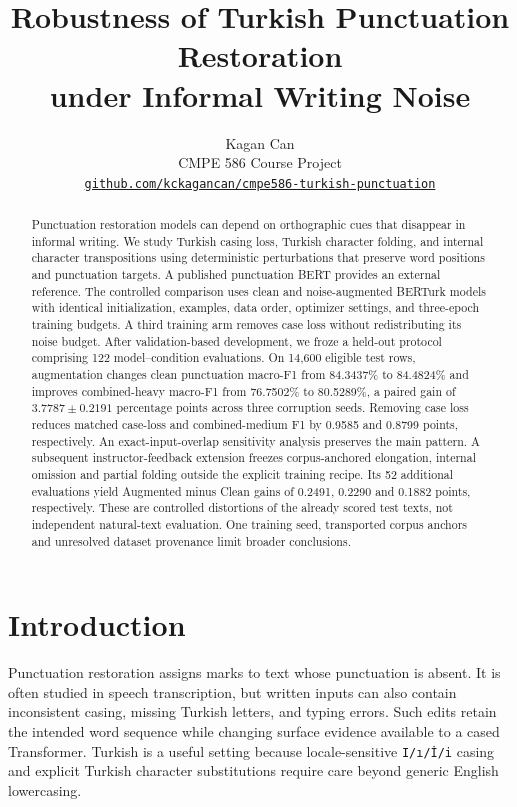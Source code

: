 \documentclass{article}
\title{Robustness of Turkish Punctuation Restoration\\under Informal Writing Noise}
\author{Kagan Can\\CMPE 586 Course Project\\
\href{https://github.com/kckagancan/cmpe586-turkish-punctuation}{\texttt{github.com/kckagancan/cmpe586-turkish-punctuation}}
\ifdefined\CourseSubmission\fi
}
\begin{document}
\maketitle
\begin{abstract}
Punctuation restoration models can depend on orthographic cues that disappear
in informal writing. We study Turkish casing loss, Turkish character folding,
and internal character transpositions using deterministic perturbations that
preserve word positions and punctuation targets. A published punctuation BERT
provides an external reference. The controlled comparison uses clean and
noise-augmented BERTurk models with identical initialization, examples, data
order, optimizer settings, and three-epoch training budgets. A third training
arm removes case loss without redistributing its noise budget. After
validation-based development, we froze a held-out protocol comprising 122
model--condition evaluations. On 14,600 eligible test rows, augmentation changes
clean punctuation macro-F1 from 84.3437\% to 84.4824\% and improves combined-heavy
macro-F1 from 76.7502\% to 80.5289\%, a paired gain of $3.7787\pm0.2191$
percentage points across three corruption seeds. Removing case loss reduces
matched case-loss and combined-medium F1 by 0.9585 and 0.8799 points,
respectively. An exact-input-overlap sensitivity analysis preserves the main
pattern. A subsequent instructor-feedback extension freezes corpus-anchored
elongation, internal omission and partial folding outside the explicit training
recipe. Its 52 additional evaluations yield Augmented minus Clean gains of
0.2491, 0.2290 and 0.1882 points, respectively. These are controlled distortions
of the already scored test texts, not independent natural-text evaluation.
One training seed, transported corpus anchors and unresolved dataset provenance
limit broader conclusions.
\end{abstract}

\section{Introduction}
Punctuation restoration assigns marks to text whose punctuation is absent. It
is often studied in speech transcription, but written inputs can also contain
inconsistent casing, missing Turkish letters, and typing errors. Such edits
retain the intended word sequence while changing surface evidence available to
a cased Transformer. Turkish is a useful setting because locale-sensitive
\texttt{I/\i/\.{I}/i} casing and explicit Turkish character substitutions require
care beyond generic English lowercasing.
\end{document}
